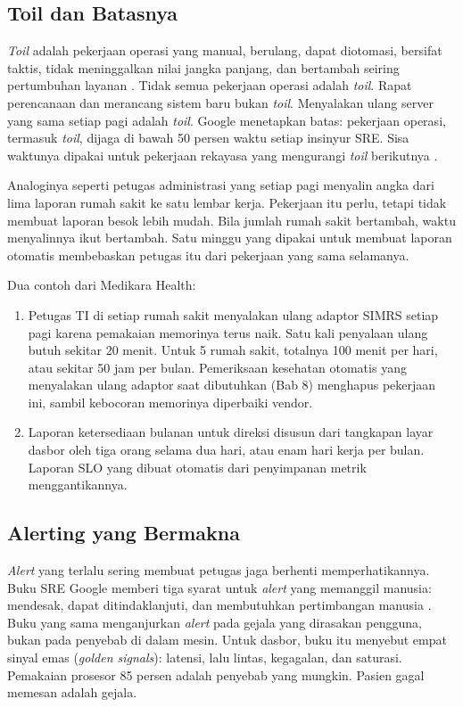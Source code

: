 \subsection{Toil dan Batasnya}

\textit{Toil} adalah pekerjaan operasi yang manual, berulang, dapat diotomasi, bersifat taktis,
tidak meninggalkan nilai jangka panjang, dan bertambah seiring pertumbuhan layanan
\cite{beyer2016}. Tidak semua pekerjaan operasi adalah \textit{toil}. Rapat perencanaan dan
merancang sistem baru bukan \textit{toil}. Menyalakan ulang server yang sama setiap pagi adalah
\textit{toil}. Google menetapkan batas: pekerjaan operasi, termasuk \textit{toil}, dijaga di bawah
50 persen waktu setiap insinyur SRE. Sisa waktunya dipakai untuk pekerjaan rekayasa yang mengurangi
\textit{toil} berikutnya \cite{beyer2016}.

Analoginya seperti petugas administrasi yang setiap pagi menyalin angka dari lima laporan rumah
sakit ke satu lembar kerja. Pekerjaan itu perlu, tetapi tidak membuat laporan besok lebih mudah.
Bila jumlah rumah sakit bertambah, waktu menyalinnya ikut bertambah. Satu minggu yang dipakai untuk
membuat laporan otomatis membebaskan petugas itu dari pekerjaan yang sama selamanya.

Dua contoh dari Medikara Health:
\begin{enumerate}
  \item Petugas TI di setiap rumah sakit menyalakan ulang adaptor SIMRS setiap pagi karena
        pemakaian memorinya terus naik. Satu kali penyalaan ulang butuh sekitar 20 menit. Untuk 5
        rumah sakit, totalnya 100 menit per hari, atau sekitar 50 jam per bulan. Pemeriksaan
        kesehatan otomatis yang menyalakan ulang adaptor saat dibutuhkan (Bab 8) menghapus
        pekerjaan ini, sambil kebocoran memorinya diperbaiki vendor.
  \item Laporan ketersediaan bulanan untuk direksi disusun dari tangkapan layar dasbor oleh tiga
        orang selama dua hari, atau enam hari kerja per bulan. Laporan SLO yang dibuat otomatis
        dari penyimpanan metrik menggantikannya.
\end{enumerate}

\subsection{Alerting yang Bermakna}

\textit{Alert} yang terlalu sering membuat petugas jaga berhenti memperhatikannya. Buku SRE Google
memberi tiga syarat untuk \textit{alert} yang memanggil manusia: mendesak, dapat ditindaklanjuti,
dan membutuhkan pertimbangan manusia \cite{beyer2016}. Buku yang sama menganjurkan
\textit{alert} pada gejala yang dirasakan pengguna, bukan pada penyebab di dalam mesin. Untuk
dasbor, buku itu menyebut empat sinyal emas (\textit{golden signals}): latensi, lalu lintas,
kegagalan, dan saturasi. Pemakaian prosesor 85 persen adalah penyebab yang mungkin. Pasien gagal
memesan adalah gejala.

